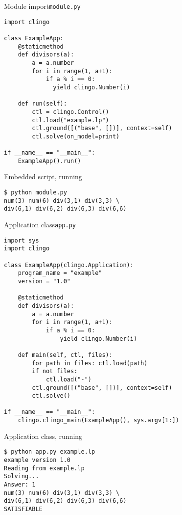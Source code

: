 \begin{frame}{Module import}{\texttt{module.py}}
\begin{lstlisting}
import clingo

class ExampleApp:
    @staticmethod
    def divisors(a):
        a = a.number
        for i in range(1, a+1):
            if a % i == 0:
              yield clingo.Number(i)

    def run(self):
        ctl = clingo.Control()
        ctl.load("example.lp")
        ctl.ground([("base", [])], context=self)
        ctl.solve(on_model=print)

if __name__ == "__main__":
    ExampleApp().run()
\end{lstlisting}
\end{frame}
\begin{frame}[fragile]{Embedded script, running}
  \bigskip
\begin{lstlisting}
$ python module.py
num(3) num(6) div(3,1) div(3,3) \
div(6,1) div(6,2) div(6,3) div(6,6)
\end{lstlisting}
\end{frame}
\begin{frame}[fragile,shrink]{Application class}{\texttt{app.py}}
\begin{lstlisting}
import sys
import clingo

class ExampleApp(clingo.Application):
    program_name = "example"
    version = "1.0"

    @staticmethod
    def divisors(a):
        a = a.number
        for i in range(1, a+1):
            if a % i == 0:
                yield clingo.Number(i)

    def main(self, ctl, files):
        for path in files: ctl.load(path)
        if not files:
            ctl.load("-")
        ctl.ground([("base", [])], context=self)
        ctl.solve()

if __name__ == "__main__":
    clingo.clingo_main(ExampleApp(), sys.argv[1:])
\end{lstlisting}
\end{frame}
\begin{frame}[fragile]{Application class, running}
  \bigskip
\begin{lstlisting}
$ python app.py example.lp
example version 1.0
Reading from example.lp
Solving...
Answer: 1
num(3) num(6) div(3,1) div(3,3) \
div(6,1) div(6,2) div(6,3) div(6,6)
SATISFIABLE
\end{lstlisting}
\end{frame}
